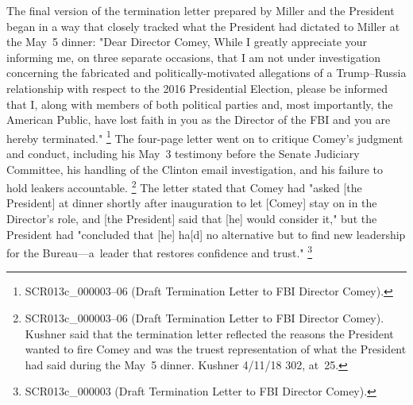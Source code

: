 The final version of the termination letter prepared by Miller and the President began in a way that closely tracked what the President had dictated to Miller at the May~5 dinner:
"Dear Director Comey, While I greatly appreciate your informing me, on three separate occasions, that I am not under investigation concerning the fabricated and politically-motivated allegations of a Trump--Russia relationship with respect to the 2016 Presidential Election, please be informed that I, along with members of both political parties and, most importantly, the American Public, have lost faith in you as the Director of the FBI and you are hereby terminated."%
\footnote{SCR013c\_000003--06 (Draft Termination Letter to FBI Director Comey).}
The four-page letter went on to critique Comey's judgment and conduct, including his May~3 testimony before the Senate Judiciary Committee, his handling of the Clinton email investigation, and his failure to hold leakers accountable.%
\footnote{SCR013c\_000003--06 (Draft Termination Letter to FBI Director Comey).
Kushner said that the termination letter reflected the reasons the President wanted to fire Comey and was the truest representation of what the President had said during the May~5 dinner.
Kushner 4/11/18 302, at~25.}
The letter stated that Comey had "asked [the President] at dinner shortly after inauguration to let [Comey] stay on in the Director's role, and [the President] said that [he] would consider it," but the President had "concluded that [he] ha[d] no alternative but to find new leadership for the Bureau---a~leader that restores confidence and trust."%
\footnote{SCR013c\_000003 (Draft Termination Letter to FBI Director Comey).}

